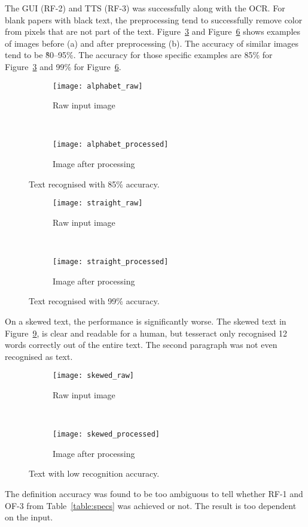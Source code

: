 \documentclass[../main.tex]{subfiles}
\begin{document}
The GUI (RF-2) and TTS (RF-3) was successfully along with the OCR\@. For blank papers with black text, the preprocessing tend to successfully remove color from pixels that are not part of the text. Figure~\ref{fig:alphabet} and Figure~\ref{fig:straight} shows examples of images before (a) and after preprocessing (b). The accuracy of similar images tend to be \~80--95\%. The accuracy for those specific examples are 85\% for Figure~\ref{fig:alphabet} and 99\% for Figure~\ref{fig:straight}.

\begin{figure}[h!]
  \centering
  \begin{subfigure}[t]{0.48\linewidth}
    \centering
    \texttt{[image: alphabet\_raw]}
    \caption{Raw input image\label{fig:alphabet_a}}
  \end{subfigure}~
  \begin{subfigure}[t]{0.48\linewidth}
    \centering
    \texttt{[image: alphabet\_processed]}
    \caption{Image after processing\label{fig:alphabet_b}}
  \end{subfigure}
  \caption{Text recognised with 85\% accuracy.\label{fig:alphabet}}
\end{figure}

\begin{figure}[h!]
  \centering
  \begin{subfigure}[t]{0.48\linewidth}
    \centering
    \texttt{[image: straight\_raw]}
    \caption{Raw input image\label{fig:straight_a}}
  \end{subfigure}~
  \begin{subfigure}[t]{0.48\linewidth}
    \centering
    \texttt{[image: straight\_processed]}
    \caption{Image after processing\label{fig:straight_b}}
  \end{subfigure}
  \caption{Text recognised with 99\% accuracy.\label{fig:straight}}
\end{figure}

On a skewed text, the performance is significantly worse. The skewed text in Figure~\ref{fig:skewed}, is clear and readable for a human, but tesseract only recognised 12 words correctly out of the entire text. The second paragraph was not even recognised as text. 

\begin{figure}[h!]
  \centering
  \begin{subfigure}[t]{0.48\linewidth}
    \centering
    \texttt{[image: skewed\_raw]}
    \caption{Raw input image\label{fig:skewed_a}}
  \end{subfigure}~
  \begin{subfigure}[t]{0.48\linewidth}
    \centering
    \texttt{[image: skewed\_processed]}
    \caption{Image after processing\label{fig:skewed_b}}
  \end{subfigure}
  \caption{Text with low recognition accuracy.\label{fig:skewed}}
\end{figure}

The definition accuracy was found to be too ambiguous to tell whether RF-1 and OF-3 from Table~\ref{table:specs} was achieved or not. The result is too dependent on the input.
\end{document}

